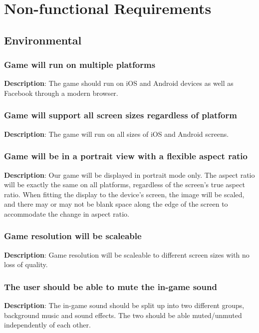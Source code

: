 \chapter{Non-functional Requirements}

\section{Environmental}
\renewcommand\thesubsection{ENV-%
\ifnum\value{subsection}<10 0\fi
\arabic{subsection}}
\subsection{Game will run on multiple platforms}
\textbf{Description}: The game should run on iOS and Android devices as well
as Facebook through a modern browser.

\subsection{Game will support all screen sizes regardless of platform}
\textbf{Description}: The game will run on all sizes of iOS and Android screens.

\subsection{Game will be in a portrait view with a flexible aspect ratio}
\textbf{Description}: Our game will be displayed in portrait mode only. The
aspect ratio will be exactly the same on all platforms, regardless
of the screen\textquoteright{}s true aspect ratio. When fitting the
display to the device\textquoteright{}s screen, the image will be
scaled, and there may or may not be blank space along the edge of
the screen to accommodate the change in aspect ratio.

\subsection{Game resolution will be scaleable}
\textbf{Description}: Game resolution will be scaleable to different screen 
sizes with no loss of quality.

\subsection{The user should be able to mute the in-game sound }
\textbf{Description}: The in-game sound should be split up into two different
groups, background music and sound effects. The two should be able
muted/unmuted independently of each other.

